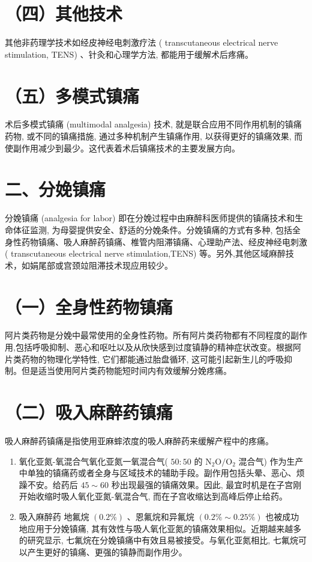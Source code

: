 \documentclass[10pt]{article}
\begin{document}
\section*{（四）其他技术}
其他非药理学技术如经皮神经电刺激疗法 ( transcutaneous electrical nerve stimulation, TENS) 、针灸和心理学方法, 都能用于缓解术后疼痛。

\section*{（五）多模式镇痛}
术后多模式镇痛 (multimodal analgesia) 技术, 就是联合应用不同作用机制的镇痛药物, 或不同的镇痛措施, 通过多种机制产生镇痛作用, 以获得更好的镇痛效果, 而使副作用减少到最少。这代表着术后镇痛技术的主要发展方向。

\section*{二、分娩镇痛}
分娩镇痛 (analgesia for labor) 即在分娩过程中由麻醉科医师提供的镇痛技术和生命体征监测, 为母婴提供安全、舒适的分娩条件。分娩镇痛的方式有多种, 包括全身性药物镇痛、吸人麻醉药镇痛、椎管内阻滞镇痛、心理助产法、经皮神经电刺激 ( transcutaneous electrical nerve stimulation,TENS) 等。另外,其他区域麻醉技术，如娟尾部或宫颈竝阻滞技术现应用较少。

\section*{（一）全身性药物镇痛}
阿片类药物是分娩中最常使用的全身性药物。所有阿片类药物都有不同程度的副作用,包括呼吸抑制、恶心和呕吐以及从欣快感到过度镇静的精神症状改变。根据阿片类药物的物理化学特性, 它们都能通过胎盘循环, 这可能引起新生儿的呼吸抑制。但是适当使用阿片类药物能短时间内有效缓解分娩疼痛。

\section*{（二）吸入麻醉药镇痛}
吸人麻醉药镇痛是指使用亚麻蟀浓度的吸人麻醉药来缓解产程中的疼痛。

\begin{enumerate}
  \item 氧化亚氮-氧混合气氧化亚氮一氧混合气( $50: 50$ 的 $\mathrm{N}_{2} \mathrm{O} / \mathrm{O}_{2}$ 混合气) 作为生产中单独的镇痛药或者全身与区域技术的辅助手段。副作用包括头晕、恶心、烦躁不安。给药后 $45 \sim 60$ 秒出现最强的镇痛效果。因此, 最宜时机是在子宫刚开始收缩时吸人氧化亚氮-氧混合气, 而在子宫收缩达到高峰后停止给药。

  \item 吸入麻醉药 地氟烷 $(0.2 \%)$ 、恩氟烷和异氟烷 $(0.2 \% \sim 0.25 \%)$ 也被成功地应用于分娩镇痛, 其有效性与吸人氧化亚氮的镇痛效果相似。近期越来越多的研究显示, 七氟烷在分娩镇痛中有效且易被接受。与氧化亚氮相比, 七氟烷可以产生更好的镇痛、更强的镇静而副作用少。

\end{enumerate}
\end{document}

